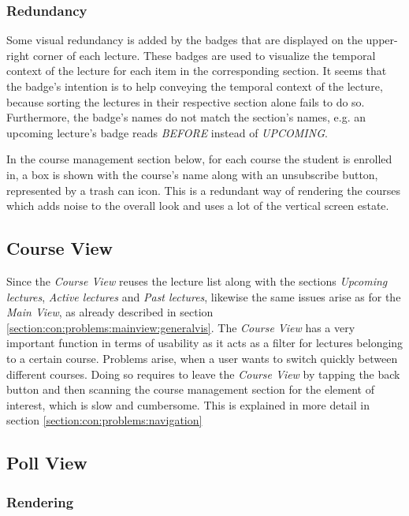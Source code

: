 \subsubsection{Redundancy}

Some visual redundancy is added by the badges that are displayed on the upper-right corner of each lecture. These badges are used to visualize the temporal context of the lecture for each item in the corresponding section. It seems that the badge's intention is to help conveying the temporal context of the lecture, because sorting the lectures in their respective section alone fails to do so. Furthermore, the badge's names do not match the section's names, e.g. an upcoming lecture's badge reads \emph{BEFORE} instead of \emph{UPCOMING}. 

In the course management section below, for each course the student is enrolled in, a box is shown with the course's name along with an unsubscribe button, represented by a trash can icon.
\todogrf
This is a redundant way of rendering the courses which adds noise to the overall look
and uses a lot of the vertical screen estate.

\subsection{Course View}

Since the \emph{Course View} reuses the lecture list along with the sections \emph{Upcoming lectures}, \emph{Active lectures} and \emph{Past lectures}, likewise the same issues arise as for the \emph{Main View}, as already described in section \ref{section:con:problems:mainview:generalvis}. 
The \emph{Course View} has a very important function in terms of usability as it acts as a filter for lectures belonging to a certain course. Problems arise, when a user wants to switch quickly between different courses. Doing so requires to leave the \emph{Course View} by tapping the back button and then scanning the course management section for the element of interest, which is slow and cumbersome. This is explained in more detail in section \ref{section:con:problems:navigation}

\subsection{Poll View}

\subsubsection{Rendering}

